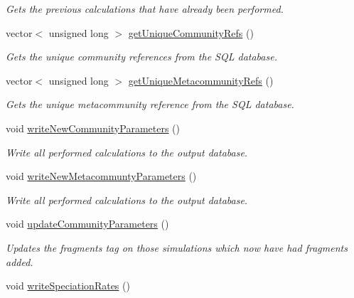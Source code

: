 \begin{DoxyCompactItemize}
\begin{DoxyCompactList}\small\item\em Gets the previous calculations that have already been performed. \end{DoxyCompactList}\item 
vector$<$ unsigned long $>$ \hyperlink{group___community_objects_aed61108d8c4fd42d39a9112c5062cad4}{get\+Unique\+Community\+Refs} ()
\begin{DoxyCompactList}\small\item\em Gets the unique community references from the S\+QL database. \end{DoxyCompactList}\item 
vector$<$ unsigned long $>$ \hyperlink{group___community_objects_a257e8e3dce33b235985ed9d167817a89}{get\+Unique\+Metacommunity\+Refs} ()
\begin{DoxyCompactList}\small\item\em Gets the unique metacommunity reference from the S\+QL database. \end{DoxyCompactList}\item 
void \hyperlink{group___community_objects_afbc8709084a00a7450e3a168cb016db9}{write\+New\+Community\+Parameters} ()\hypertarget{group___community_objects_afbc8709084a00a7450e3a168cb016db9}{}\label{group___community_objects_afbc8709084a00a7450e3a168cb016db9}

\begin{DoxyCompactList}\small\item\em Write all performed calculations to the output database. \end{DoxyCompactList}\item 
void \hyperlink{group___community_objects_ac900c23ffe2572504fca11f20b7ba8cd}{write\+New\+Metacommunty\+Parameters} ()\hypertarget{group___community_objects_ac900c23ffe2572504fca11f20b7ba8cd}{}\label{group___community_objects_ac900c23ffe2572504fca11f20b7ba8cd}

\begin{DoxyCompactList}\small\item\em Write all performed calculations to the output database. \end{DoxyCompactList}\item 
void \hyperlink{group___community_objects_af3f5939bfb59fdf3b7d7b5f3699bd225}{update\+Community\+Parameters} ()\hypertarget{group___community_objects_af3f5939bfb59fdf3b7d7b5f3699bd225}{}\label{group___community_objects_af3f5939bfb59fdf3b7d7b5f3699bd225}

\begin{DoxyCompactList}\small\item\em Updates the fragments tag on those simulations which now have had fragments added. \end{DoxyCompactList}\item 
void \hyperlink{group___community_objects_adcfc04e92cbb597682dcc1f2913d6668}{write\+Speciation\+Rates} ()\hypertarget{group___community_objects_adcfc04e92cbb597682dcc1f2913d6668}{}\label{group___community_objects_adcfc04e92cbb597682dcc1f2913d6668}


\end{DoxyCompactItemize}
